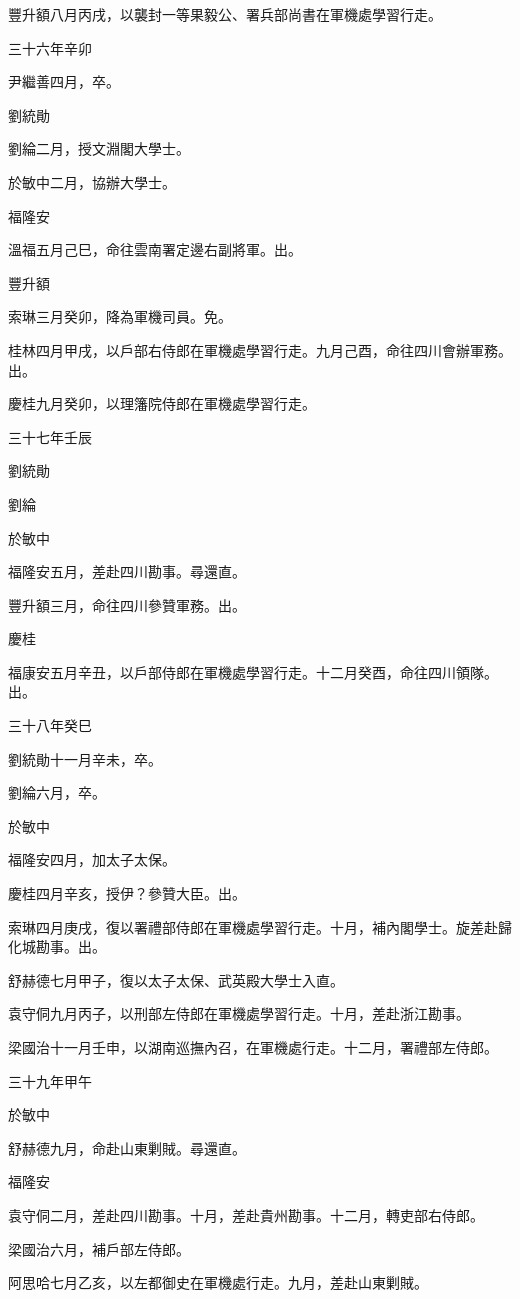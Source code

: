 \begin{pinyinscope}
豐升額八月丙戌，以襲封一等果毅公、署兵部尚書在軍機處學習行走。

三十六年辛卯

尹繼善四月，卒。

劉統勛

劉綸二月，授文淵閣大學士。

於敏中二月，協辦大學士。

福隆安

溫福五月己巳，命往雲南署定邊右副將軍。出。

豐升額

索琳三月癸卯，降為軍機司員。免。

桂林四月甲戌，以戶部右侍郎在軍機處學習行走。九月己酉，命往四川會辦軍務。出。

慶桂九月癸卯，以理籓院侍郎在軍機處學習行走。

三十七年壬辰

劉統勛

劉綸

於敏中

福隆安五月，差赴四川勘事。尋還直。

豐升額三月，命往四川參贊軍務。出。

慶桂

福康安五月辛丑，以戶部侍郎在軍機處學習行走。十二月癸酉，命往四川領隊。出。

三十八年癸巳

劉統勛十一月辛未，卒。

劉綸六月，卒。

於敏中

福隆安四月，加太子太保。

慶桂四月辛亥，授伊？參贊大臣。出。

索琳四月庚戌，復以署禮部侍郎在軍機處學習行走。十月，補內閣學士。旋差赴歸化城勘事。出。

舒赫德七月甲子，復以太子太保、武英殿大學士入直。

袁守侗九月丙子，以刑部左侍郎在軍機處學習行走。十月，差赴浙江勘事。

梁國治十一月壬申，以湖南巡撫內召，在軍機處行走。十二月，署禮部左侍郎。

三十九年甲午

於敏中

舒赫德九月，命赴山東剿賊。尋還直。

福隆安

袁守侗二月，差赴四川勘事。十月，差赴貴州勘事。十二月，轉吏部右侍郎。

梁國治六月，補戶部左侍郎。

阿思哈七月乙亥，以左都御史在軍機處行走。九月，差赴山東剿賊。


\end{pinyinscope}
